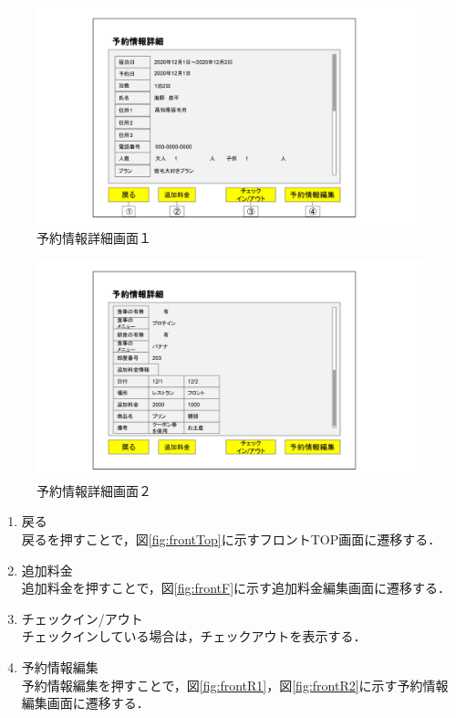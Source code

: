 \begin{figure}[H]
 \centering
   \includegraphics[width=150mm]{UI_front/info1.jpg}
 \caption{予約情報詳細画面１}
 \label{fig:frontinf1}
\end{figure}

\begin{figure}[H]
 \centering
   \includegraphics[width=150mm]{UI_front/info2.jpg}
 \caption{予約情報詳細画面２}
 \label{fig:frontinf2}
\end{figure}

\begin{enumerate}
\renewcommand{\labelenumi}{\textcircled{\scriptsize \theenumi}}
\item 戻る\\ 戻るを押すことで，図\ref{fig:frontTop}に示すフロントTOP画面に遷移する．
\item 追加料金\\ 追加料金を押すことで，図\ref{fig:frontF}に示す追加料金編集画面に遷移する．
\item チェックイン/アウト\\ チェックインしている場合は，チェックアウトを表示する．
\item 予約情報編集\\ 予約情報編集を押すことで，図\ref{fig:frontR1}，図\ref{fig:frontR2}に示す予約情報編集画面に遷移する．
\end{enumerate}

